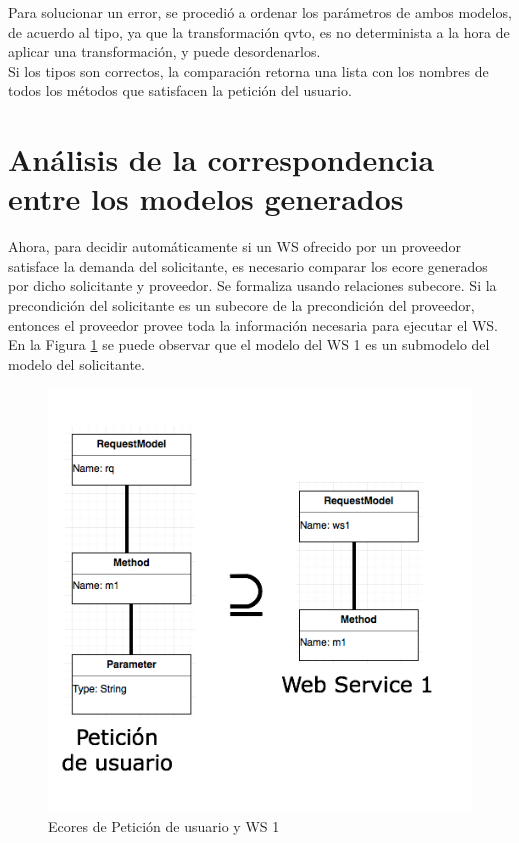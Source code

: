 

Para solucionar un error, se procedió a ordenar los parámetros de ambos modelos, de acuerdo al tipo, ya que la transformación qvto, es no determinista a la hora de aplicar una transformación, y puede desordenarlos.\\
Si los tipos son correctos, la comparación retorna una lista con los nombres de todos los métodos que satisfacen la petición del usuario.

\section{Análisis de la correspondencia entre los modelos generados}

Ahora, para decidir automáticamente si un WS ofrecido por un proveedor satisface la demanda del solicitante, es necesario comparar los ecore generados por dicho solicitante y proveedor. Se formaliza usando relaciones subecore. Si la precondición del solicitante es un subecore de la precondición del proveedor, entonces el proveedor provee toda la información necesaria para ejecutar el WS.\\
En la Figura \ref{fig:Ecores de Petición de usuario y WS 1} se puede observar que el modelo del WS 1 es un submodelo del modelo del solicitante.

\begin{figure}[!h] 
	\begin{center}
		\includegraphics [scale=0.60]{imagenes/Ecores_de_Peticion_de_usuario_y_WS_1.jpg}
	\end{center}
	\caption{Ecores de Petición de usuario y WS 1}
	\label{fig:Ecores de Petición de usuario y WS 1}
\end{figure} 

